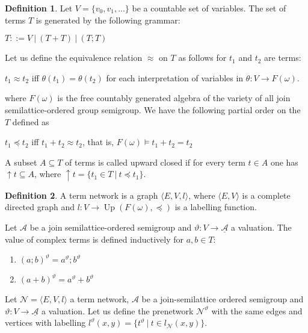 \documentclass[a4paper]{article}
\theoremstyle{definition}
\newtheorem{definition}{Definition}
\theoremstyle{theorem}
\theoremstyle{proposition}
\theoremstyle{lemma}
\theoremstyle{ex}
\theoremstyle{corollary}
\theoremstyle{claim}
\begin{document}
\begin{definition}
  Let $V = \{ v_0, v_1, ... \}$ be a countable set of variables. The set of terms $T$ is generated by the following grammar:

  \begin{center}
    $T ::= V \: | \: (T + T) \: | \: (T ; T)$
  \end{center}
\end{definition}

Let us define the equivalence relation $\approx$ on $T$ as follows for $t_1$ and $t_2$ are terms:
\begin{center}
$t_1 \approx t_2$ iff $\theta(t_1) = \theta(t_2)$ for each interpretation of variables in $\theta : V \to F(\omega)$.
\end{center}
where $F(\omega)$ is the free countably generated algebra of the variety of all join semilattice-ordered group semigroup. We have the following partial order on the $T$ defined as
\begin{center}
  $t_1 \preceq t_2$ iff $t_1 + t_2 \approx t_2$, that is, $F(\omega) \models t_1 + t_2 = t_2$
\end{center}
A subset $A \subseteq T$ of terms is called upward closed if for every term $t \in A$ one has $\uparrow t \subseteq A$, where $\uparrow t = \{ t_1 \in T \: | \: t \preceq t_1 \}$.


\begin{definition}
  A term network is a graph $\langle E, V, l \rangle$, where $\langle E, V \rangle$ is a complete directed graph and $l : V \to \operatorname{Up}(F(\omega), \preceq)$ is a labelling function.
\end{definition}

Let $\mathcal{A}$ be a join semilattice-ordered semigroup and $\vartheta : V \to \underline{{\mathcal{A}}}$ a valuation. The value of complex terms is defined inductively for $a, b \in T$:

\begin{enumerate}
  \item $(a ; b)^{\vartheta} = a^{\vartheta} ; b^{\vartheta}$
  \item $(a + b)^{\vartheta} = a^{\vartheta} + b^{\vartheta}$
\end{enumerate}

Let $\mathcal{N} = \langle E, V, l \rangle$ a term network, $\mathcal{A}$ be a join-semilattice ordered semigroup and $\vartheta : V \to \underline{{\mathcal{A}}}$ a valuation. Let us define the prenetwork $\mathcal{N}^{\vartheta}$ with the same edges and vertices with labelling $l^{\vartheta}(x, y) = \{ t^{\vartheta} \: | \: t \in l_{\mathcal{N}}(x, y)\}$.
\end{document}
